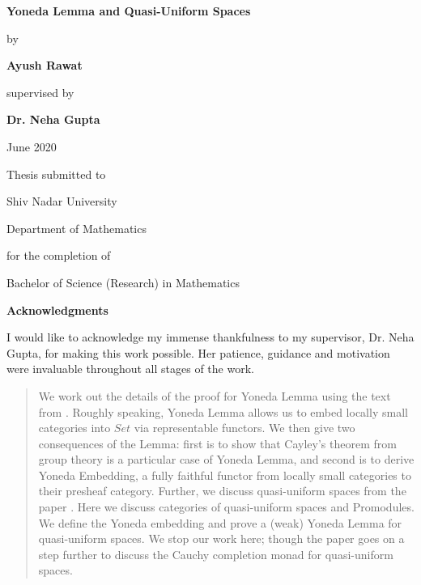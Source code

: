\documentclass[a4paper]{article}
\theoremstyle{definition}
\begin{document}
\begin{titlepage}
    \begin{center}
        \vspace*{1cm}

        \Huge
        \textbf{Yoneda Lemma and Quasi-Uniform Spaces}

        \vspace{0.5cm}
        \LARGE
	by
        \vspace{1.5cm}

        \textbf{Ayush Rawat}

        \vspace{1.5cm}
        \LARGE
	supervised by
        \vspace{0.5cm}

	\textbf{Dr. Neha Gupta}

        \vspace{2cm}

        \Large
	June 2020

        \vfill

	Thesis submitted to

	Shiv Nadar University

	Department of Mathematics

	for the completion of

	Bachelor of Science (Research) in Mathematics
        \vspace{0.8cm}



    \end{center}
\end{titlepage}
\begin{titlepage}
	\begin{center}
		\vspace*{1cm}

		\Huge
		\textbf{Acknowledgments}

	\end{center}
		\vspace{2cm}
		\LARGE
		I would like to acknowledge my immense thankfulness to my supervisor,
		Dr. Neha Gupta, for making this work possible.
		Her patience, guidance and motivation were invaluable throughout all stages of the work.
		\vfill
\end{titlepage}
\thispagestyle{empty}
\newpage
\begin{abstract}
	We work out the details of the proof for Yoneda Lemma using the text from \cite{Tom}.
	Roughly speaking, Yoneda Lemma allows us to embed locally small categories into $Set$ via
	representable functors. We then give two consequences of the Lemma: first is to show
	that Cayley's theorem
	from group theory is a particular case of Yoneda Lemma, and second is to
	derive Yoneda Embedding, a fully faithful functor from locally small categories to
	their presheaf category.
	Further,
	we discuss quasi-uniform spaces from the paper \cite{Clementino_Hofmann_2011}. Here
	we discuss categories of quasi-uniform spaces and Promodules. We define the Yoneda
	embedding and prove a (weak) Yoneda Lemma for quasi-uniform spaces. We stop our work
	here; though the paper goes on a step further to discuss the Cauchy completion monad for
	quasi-uniform spaces.
\end{abstract}
\tableofcontents
\end{document}

